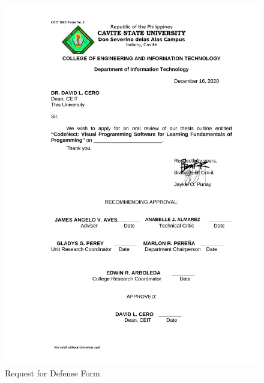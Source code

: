 \begin{figure}[H]
	 \centering
	 \includegraphics[width=\textwidth]{figures/5_request_defense.png}
	 \caption[]{Request for Defense Form}
	 \label{fig:request_defense}
\end{figure}
